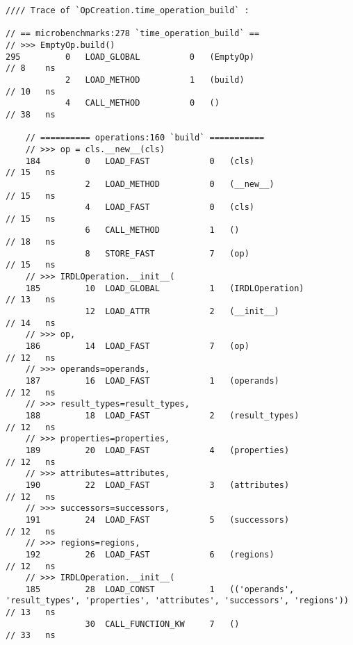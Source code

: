 \vspace{2em}
\begin{code}
    \begin{verbatim}
//// Trace of `OpCreation.time_operation_build` :

// == microbenchmarks:278 `time_operation_build` ==
// >>> EmptyOp.build()
295         0   LOAD_GLOBAL          0   (EmptyOp)                                          // 8    ns
            2   LOAD_METHOD          1   (build)                                            // 10   ns
            4   CALL_METHOD          0   ()                                                 // 38   ns

    // ========== operations:160 `build` ===========
    // >>> op = cls.__new__(cls)
    184         0   LOAD_FAST            0   (cls)                                          // 15   ns
                2   LOAD_METHOD          0   (__new__)                                      // 15   ns
                4   LOAD_FAST            0   (cls)                                          // 15   ns
                6   CALL_METHOD          1   ()                                             // 18   ns
                8   STORE_FAST           7   (op)                                           // 15   ns
    // >>> IRDLOperation.__init__(
    185         10  LOAD_GLOBAL          1   (IRDLOperation)                                // 13   ns
                12  LOAD_ATTR            2   (__init__)                                     // 14   ns
    // >>> op,
    186         14  LOAD_FAST            7   (op)                                           // 12   ns
    // >>> operands=operands,
    187         16  LOAD_FAST            1   (operands)                                     // 12   ns
    // >>> result_types=result_types,
    188         18  LOAD_FAST            2   (result_types)                                 // 12   ns
    // >>> properties=properties,
    189         20  LOAD_FAST            4   (properties)                                   // 12   ns
    // >>> attributes=attributes,
    190         22  LOAD_FAST            3   (attributes)                                   // 12   ns
    // >>> successors=successors,
    191         24  LOAD_FAST            5   (successors)                                   // 12   ns
    // >>> regions=regions,
    192         26  LOAD_FAST            6   (regions)                                      // 12   ns
    // >>> IRDLOperation.__init__(
    185         28  LOAD_CONST           1   (('operands', 'result_types', 'properties', 'attributes', 'successors', 'regions'))  // 13   ns
                30  CALL_FUNCTION_KW     7   ()                                             // 33   ns


\end{verbatim}
\end{code}
